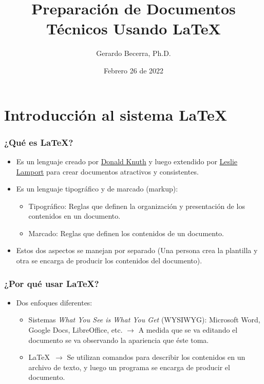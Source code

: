 \documentclass[aspectratio=169]{beamer}
\title{Preparación de Documentos Técnicos Usando \LaTeX}
\author{Gerardo Becerra, Ph.D.}
\institute{UNAD}
\date{Febrero 26 de 2022}
\institute{Escuela de Ciencias Básicas, Tecnología e Ingeniería}
\begin{document}
{%
	\frame{\titlepage}
}

\section{Introducción al sistema \LaTeX}
\begin{frame}[t]\frametitle{¿Qué es \LaTeX?}
	\begin{itemize}
		\item Es un lenguaje creado por \href{https://en.wikipedia.org/wiki/Donald_Knuth}{Donald Knuth} y luego extendido por \href{https://en.wikipedia.org/wiki/Leslie_Lamport}{Leslie Lamport} para crear documentos atractivos y consistentes.
		\item Es un lenguaje tipográfico y de marcado (markup):
		\begin{itemize}
			\item Tipográfico: Reglas que definen la organización y presentación de los contenidos en un documento.
			\item Marcado: Reglas que definen los contenidos de un documento.
		\end{itemize}
		\item Estos dos aspectos se manejan por separado (Una persona crea la plantilla y otra se encarga de producir los contenidos del documento).
	\end{itemize}
\end{frame}

\begin{frame}[t]\frametitle{¿Por qué usar \LaTeX?}
	\begin{itemize}
		\item Dos enfoques diferentes:
		\begin{itemize}
			\item Sistemas \emph{What You See is What You Get} (WYSIWYG): Microsoft Word, Google Docs, LibreOffice, etc. $\longrightarrow$ A medida que se va editando el documento se  va observando la apariencia que éste toma. 
			\item \LaTeX\ $\longrightarrow$ Se utilizan comandos para describir los contenidos en un archivo de texto, y luego un programa se encarga de producir el documento.
		\end{itemize}
	\end{itemize}	
\end{frame}
\end{document}
